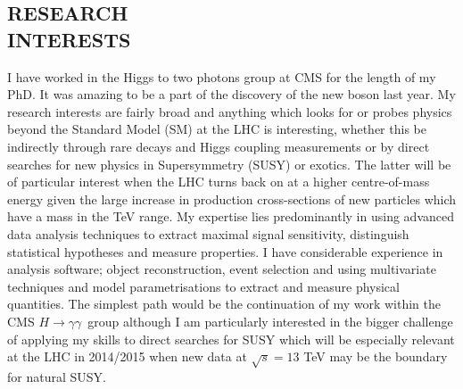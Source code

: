 \documentclass[margin, 10pt]{res} %
\newcommand{\Htogg}{\ensuremath{H\rightarrow\gamma\gamma}~}
\begin{document}
\begin{resume}

 
\section{RESEARCH \\ INTERESTS}  


I have worked in the Higgs to two photons group at CMS for the length of my PhD. 
It was amazing to be a part of the discovery of the new boson last year.
My research interests are fairly broad and anything which looks for or probes physics beyond the Standard Model (SM) at the LHC is interesting, whether this be indirectly through rare decays and Higgs coupling measurements or by direct searches for new physics in Supersymmetry (SUSY) or exotics.
The latter will be of particular interest when the LHC turns back on at a higher centre-of-mass energy given the large increase in production cross-sections of new particles which have a mass in the TeV range. My expertise lies predominantly in using advanced data analysis techniques to extract maximal signal sensitivity, distinguish statistical hypotheses and measure properties. I have considerable experience in analysis software; object reconstruction, event selection and using multivariate techniques and model parametrisations to extract and measure physical quantities. 
The simplest path would be the continuation of my work within the CMS \Htogg group although I am particularly interested in the bigger challenge of applying my skills to direct searches for SUSY which will be especially relevant at the LHC in 2014/2015 when new data at $\sqrt{s}=13$ TeV may be the boundary for natural SUSY.


\end{resume}
\end{document}
